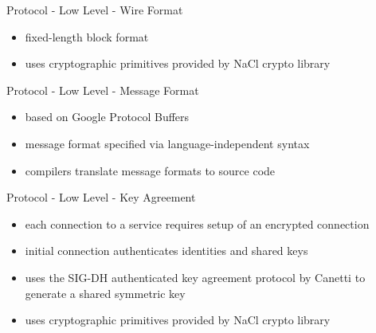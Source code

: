 \documentclass[a4paper]{beamer}
\begin{document}
\begin{frame}{Protocol - Low Level - Wire Format}
    \begin{figure}
    \centering

    \end{figure}
    \begin{itemize}
        \item fixed-length block format
        \item uses cryptographic primitives provided by NaCl crypto library \cite{nacl}
    \end{itemize}
\end{frame}

\begin{frame}{Protocol - Low Level - Message Format}
    \begin{itemize}
        \item based on Google Protocol Buffers \cite{varda2008protocol}
        \item message format specified via language-independent syntax
        \item compilers translate message formats to source code
    \end{itemize}
\end{frame}

\begin{frame}[fragile]{Protocol - Low Level - Key Agreement}
    \begin{itemize}
        \item each connection to a service requires setup of an encrypted connection
        \item initial connection authenticates identities and shared keys
        \item uses the SIG-DH authenticated key agreement protocol by Canetti \cite{canetti2001analysis} to generate a shared symmetric key
        \item uses cryptographic primitives provided by NaCl crypto library \cite{nacl}
    \end{itemize}
\end{frame}
\end{document}
